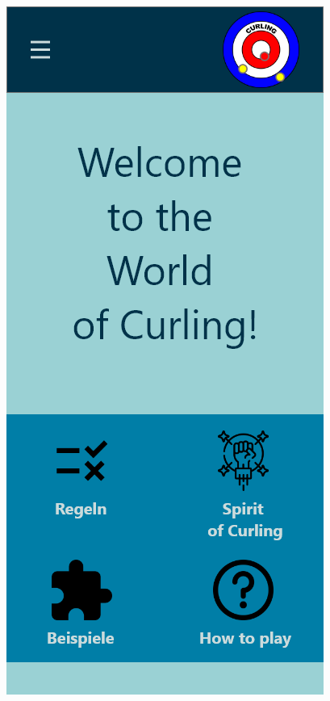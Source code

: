 \documentclass[11pt]{article}
\begin{document}
\begin{landscape}
\begin{minipage}[c]{0.4\textwidth}
            \includegraphics[width=\linewidth]{media/mobile_home}
        \end{minipage}
    \end{landscape}
    \pagebreak
\end{document}
